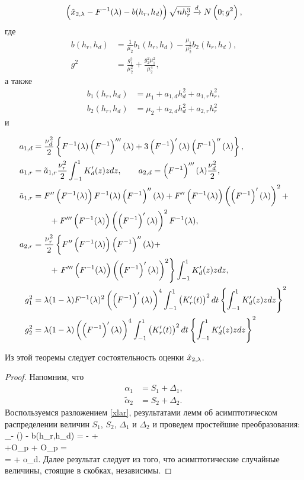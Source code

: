 \documentclass[a4paper,14pt,russian]{article}
\begin{document}
\begin{theorem}
   \begin{equation*}
   \left(\hat{x}_{2,\lambda} - F^{-1}(\lambda) - b(h_r,h_d)\right)\sqrt{n h_r^3} \xrightarrow{d} N\left(0;g^2\right),
   \end{equation*}
   где
   \begin{align*}
     b(h_r,h_d) &= \frac{1}{\mu_2}b_1(h_r,h_d) - \frac{\mu_1}{\mu_2^2} b_2(h_r,h_d),\\
     g^2 &= \frac{g_1^2}{\mu_2^2} + \frac{g_2^2 \mu_1^2}{\mu_2^4},
   \end{align*}
   а также
   \begin{align*}
   b_{1}(h_r,h_d) &= \mu_1+a_{1,d}h_d^2  + a_{1,r}h_r^2 ,\\
   b_{2}(h_r,h_d) &= \mu_2+a_{2,d}h_d^2  + a_{2,r}h_r^2
   \end{align*}
   и


\begin{align*}
a_{1,d} &= \frac{\nu_d^2}{2}\left\{F^{-1} (\lambda) \left(F^{-1}\right)'''(\lambda) + 3\left(F^{-1}\right)'(\lambda)\left(F^{-1}\right)''(\lambda)  \right\},\\
   a_{1,r} &=  \tilde{a}_{1,r}\frac{\nu_r^2}{2}\int_{-1}^1 K'_d(z)z dz,\qquad
  a_{2,d} =\left(F^{-1}\right)'''(\lambda) \frac{\nu_d^2}{2},\\
   \tilde{a}_{1,r} &= F''\left(F^{-1}(\lambda)\right)F^{-1}(\lambda)\left(F^{-1}\right)''(\lambda) + F''\left(F^{-1}(\lambda)\right)\left(\left(F^{-1}\right)'(\lambda)\right)^2 + \\&\qquad+ F'''\left(F^{-1}(\lambda)\right)\left(\left(F^{-1}\right)'(\lambda)\right)^2F^{-1}(\lambda),\\
  a_{2,r} &= \frac{\nu_r^2}{2}\left\{F''\left(F^{-1}(\lambda)\right)\left(F^{-1}\right)''(\lambda) +  \right. \\&\qquad+\left. F'''\left(F^{-1}(\lambda)\right)\left(\left(F^{-1}\right)'(\lambda)\right)^2\right\} \int _{-1}^1K'_d(z)zdz,\\
  g_1^2 & = \lambda(1-\lambda)F^{-1}(\lambda)^2\left(\left(F^{-1}\right)'(\lambda)\right)^4 \int_{-1}^1 \left(K'_r(t)\right)^2dt \left\{\int_{-1}^1 K_d'(z)zdz\right\}^2\\
  g_2^2 & = \lambda(1-\lambda)\left(\left(F^{-1}\right)'(\lambda)\right)^4 \int_{-1}^1 \left(K'_r(t)\right)^2dt \left\{\int_{-1}^1 K_d'(z)zdz\right\}^2
\end{align*}
\end{theorem}
\begin{remark}
  Из этой теоремы следует состоятельность оценки $\hat{x}_{2,\lambda}$.
\end{remark}
\begin{proof}
Напомним, что
\begin{align*}
  \alpha_1 &= S_1 + \Delta_1,\\
  \tilde{\alpha}_2 &= S_2 + \Delta_2.
\end{align*}
  Воспользуемся разложением \eqref{xlar}, результатами лемм об асимптотическом распределении величин $S_1$, $S_2$, $\Delta_1$ и $\Delta_2$ и проведем простейшие преобразования:
  \ml
  {
  _\la - \F(\la) - b(h_r,h_d) =  -   + \\+O_p + O_p = \\
  =  + o_d.
  }
  Далее результат следует из того, что асимптотические случайные величины, стоящие в скобках, независимы.
\end{proof}
\end{document}
